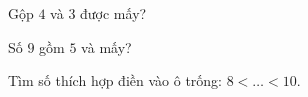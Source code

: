 \begin{ex} %
Gộp $4$ và $3$ được mấy?
\end{ex}

\begin{ex} %
Số $9$ gồm $5$ và mấy?
\end{ex}

\begin{ex} %
Tìm số thích hợp điền vào ô trống: $8 < \dots < 10$.
\end{ex}
